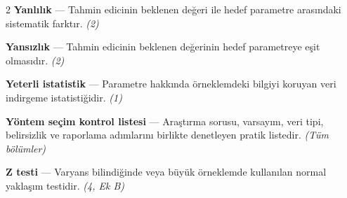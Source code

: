\begin{multicols}{2}
\textbf{Yanlılık} --- Tahmin edicinin beklenen değeri ile hedef parametre arasındaki sistematik farktır. \emph{(2)}\par
\textbf{Yansızlık} --- Tahmin edicinin beklenen değerinin hedef parametreye eşit olmasıdır. \emph{(2)}\par
\textbf{Yeterli istatistik} --- Parametre hakkında örneklemdeki bilgiyi koruyan veri indirgeme istatistiğidir. \emph{(1)}\par
\textbf{Yöntem seçim kontrol listesi} --- Araştırma sorusu, varsayım, veri tipi, belirsizlik ve raporlama adımlarını birlikte denetleyen pratik listedir. \emph{(Tüm bölümler)}\par
\textbf{Z testi} --- Varyans bilindiğinde veya büyük örneklemde kullanılan normal yaklaşım testidir. \emph{(4, Ek B)}\par

\normalsize
\end{multicols}
